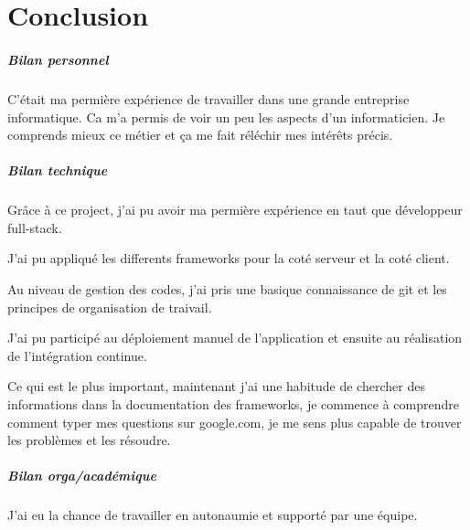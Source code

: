 \chapter*{Conclusion}
\label{chap:Conclusion}

\paragraph{Bilan personnel}
C'était ma permière expérience de travailler dans une grande entreprise informatique.
Ca m'a permis de voir un peu les aspects d'un informaticien.
Je comprends mieux ce métier et ça me fait réléchir mes intérêts précis.

\paragraph{Bilan technique}
Grâce à ce project, j'ai pu avoir ma permière expérience en taut que développeur full-stack.

J'ai pu appliqué les differents frameworks pour la coté serveur et la coté client.

Au niveau de gestion des codes, j'ai pris une basique connaissance de git et les principes de organisation de traivail.

J'ai pu participé au déploiement manuel de l'application et ensuite au réalisation de l'intégration continue.

Ce qui est le plus important, maintenant j'ai une habitude de chercher des informations dans la documentation des frameworks,
je commence à comprendre comment typer mes questions sur google.com,
je me sens plus capable de trouver les problèmes et les résoudre.

\paragraph{Bilan orga/académique}
J'ai eu la chance de travailler en autonaumie et supporté par une équipe.
